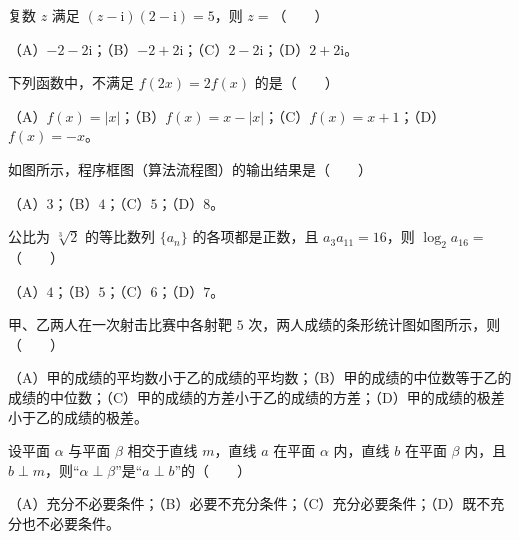 

\begin{question}
复数 $z$ 满足 $(z-\mathrm i)(2-\mathrm i)=5$，则 $z=$\mbox{（　　）}

（A）$-2-2\mathrm i$；（B）$-2+2\mathrm i$；（C）$2-2\mathrm i$；（D）$2+2\mathrm i$。

\end{question}
\begin{question}
下列函数中，不满足 $f(2x)=2f(x)$ 的是\mbox{（　　）}

（A）$f(x)=|x|$；（B）$f(x)=x-|x|$；（C）$f(x)=x+1$；（D）$f(x)=-x$。

\Needspace{0.4\textheight}
\end{question}
\begin{question}
如图所示，程序框图（算法流程图）的输出结果是\mbox{（　　）}
\nopagebreak[4]
\begin{center}\end{center}
\nopagebreak[4]
（A）$3$；（B）$4$；（C）$5$；（D）$8$。

\end{question}
\begin{question}
公比为 $\sqrt[3]{2}$ 的等比数列 $\{a_n\}$ 的各项都是正数，且 $a_3a_{11}=16$，则 $\log_2a_{16}=$\mbox{（　　）}

（A）$4$；（B）$5$；（C）$6$；（D）$7$。

\Needspace{0.4\textheight}
\end{question}
\begin{question}
甲、乙两人在一次射击比赛中各射靶 $5$ 次，两人成绩的条形统计图如图所示，则\mbox{（　　）}
\nopagebreak[4]
\begin{center}\end{center}
\nopagebreak[4]
（A）甲的成绩的平均数小于乙的成绩的平均数；（B）甲的成绩的中位数等于乙的成绩的中位数；（C）甲的成绩的方差小于乙的成绩的方差；（D）甲的成绩的极差小于乙的成绩的极差。

\end{question}
\begin{question}
设平面 $\alpha$ 与平面 $\beta$ 相交于直线 $m$，直线 $a$ 在平面 $\alpha$ 内，直线 $b$ 在平面 $\beta$ 内，且 $b\perp m$，则“$\alpha\perp\beta$”是“$a\perp b$”的\mbox{（　　）}

（A）充分不必要条件；（B）必要不充分条件；（C）充分必要条件；（D）既不充分也不必要条件。

\end{question}
